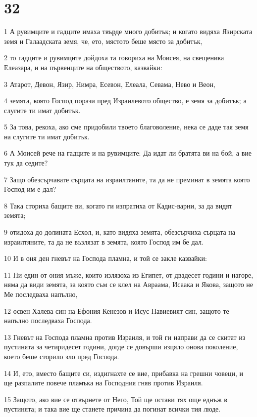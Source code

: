 \chapter{32}

\par 1 А рувимците и гадците имаха твърде много добитък; и когато видяха Язирската земя и Галаадската земя, че, ето, мястото беше място за добитък,
\par 2 то гадците и рувимците дойдоха та говориха на Моисея, на свещеника Елеазара, и на първенците на обществото, казвайки:
\par 3 Атарот, Девон, Язир, Нимра, Есевон, Елеала, Севама, Нево и Веон,
\par 4 земята, която Господ порази пред Израилевото общество, е земя за добитък; а слугите ти имат добитък.
\par 5 За това, рекоха, ако сме придобили твоето благоволение, нека се даде тая земя на слугите ти имат добитък.
\par 6 А Моисей рече на гадците и на рувимците: Да идат ли братята ви на бой, а вие тук да седите?
\par 7 Защо обезсърчавате сърцата на израилтяните, та да не преминат в земята която Господ им е дал?
\par 8 Така сториха бащите ви, когато ги изпратиха от Кадис-варни, за да видят земята;
\par 9 отидоха до долината Есхол, и, като видяха земята, обезсърчиха сърцата на израилтяните, та да не възлязат в земята, която Господ им бе дал.
\par 10 И в оня ден гневът на Господа пламна, и той се закле казвайки:
\par 11 Ни един от ония мъже, които излязоха из Египет, от двадесет години и нагоре, няма да види земята, за която съм се клел на Авраама, Исаака и Якова, защото не Ме последваха напълно,
\par 12 освен Халева син на Ефония Кенезов и Исус Навиевият син, защото те напълно последваха Господа.
\par 13 Гневът на Господа пламна против Израиля, и той ги направи да се скитат из пустинята за четиридесет години, догде се довърши изцяло онова поколение, което беше сторило зло пред Господа.
\par 14 И, ето, вместо бащите си, издигнахте се вие, прибавка на грешни човеци, и ще разпалите повече пламъка на Господния гняв против Израиля.
\par 15 Защото, ако вие се отвърнете от Него, Той ще остави тях още еднъж в пустинята; и така вие ще станете причина да погинат всички тия люде.
